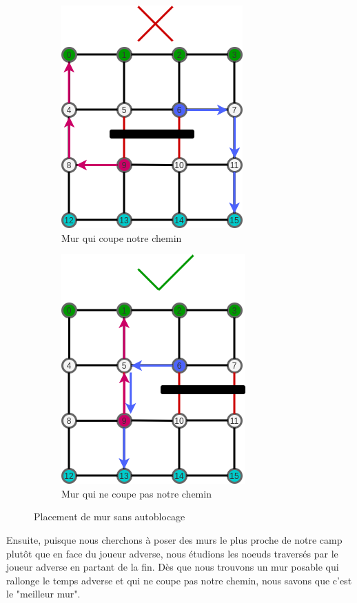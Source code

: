 \documentclass[a4paper]{article}
\begin{document}
\begin{figure}[ht]
    \centering
    \begin{subfigure}{.5\textwidth}
        \centering
        \includegraphics[scale=0.7]{cut_path.png}
        \caption{Mur qui coupe notre chemin}
        \label{fig:cut_path1}
    \end{subfigure}%
    \begin{subfigure}{.5\textwidth}
        \centering
        \includegraphics[scale=0.7]{cut_path2.png}
        \caption{Mur qui ne coupe pas notre chemin}
        \label{fig:cut_path2}
    \end{subfigure}%

    \caption{Placement de mur sans autoblocage}
    \label{fig:cut_path}
\end{figure}




Ensuite, puisque nous cherchons à poser des murs le plus proche de notre camp plutôt que en face du joueur adverse, nous étudions les noeuds traversés par le joueur adverse en partant de la fin. Dès que nous trouvons un mur posable qui rallonge le temps adverse et qui ne coupe pas notre chemin, nous savons que c'est le "meilleur mur". \\
\end{document}

